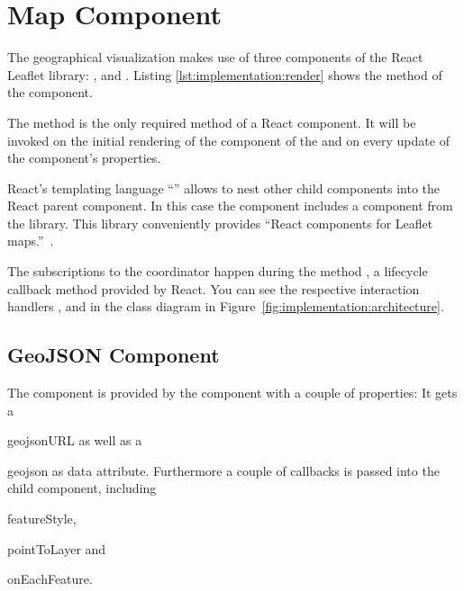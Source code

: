 

\section{Map Component}

The geographical visualization makes use of three components of the React Leaflet library:
,  and .
Listing \ref{lst:implementation:render} shows the  method of the component.



The  method is the only required method of a React component.
It will be invoked on the initial rendering of the component of the  and on every update of the component's properties.

React's templating language ``'' allows to nest other child components into the React parent component.
In this case the  component includes a   component from the  library.
This library conveniently provides ``React components for Leaflet maps.''~\parencite{ReactLeaflet2017}.

The subscriptions to the coordinator happen during the method , a lifecycle callback method provided by React.
You can see the respective interaction handlers ,  and  in the class diagram in Figure~\ref{fig:implementation:architecture}.


\subsection{GeoJSON Component}

The  component is provided by the  component with a couple of properties:
It gets a
\begin{enumerate*}[label=(\arabic*)]
  \item
    geojsonURL as well as a
  \item
    geojson as data attribute. Furthermore a couple of callbacks is passed into the child component, including
  \item
    featureStyle,
  \item
    pointToLayer and
  \item
    onEachFeature.
\end{enumerate*}

